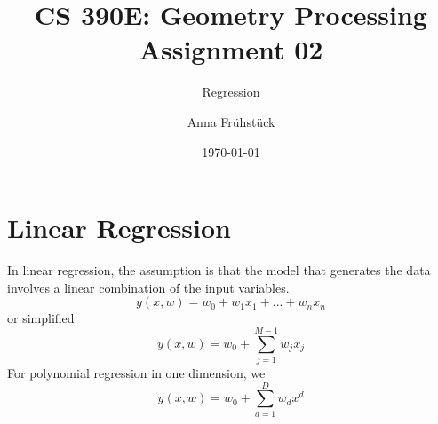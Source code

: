 \documentclass{scrartcl}
\title{CS 390E: Geometry Processing \\ Assignment 02} %
\subtitle{Regression}
\author{Anna Fr\"{u}hst\"{u}ck} %
\date{\today}
\begin{document}
\maketitle %



\section{Linear Regression}
In linear regression, the assumption is that the model that generates the data involves a linear combination of the input variables.
$$y(x, w) = w_0 + w_1x_1 + ... + w_nx_n$$
or simplified 
$$y(x, w) = w_0 + \sum_{j=1}^{M-1}{w_jx_j}$$
For polynomial regression in one dimension, we 
$$y(x, w) = w_0 + \sum_{d=1}^{D}{w_dx^d}$$
\end{document}
